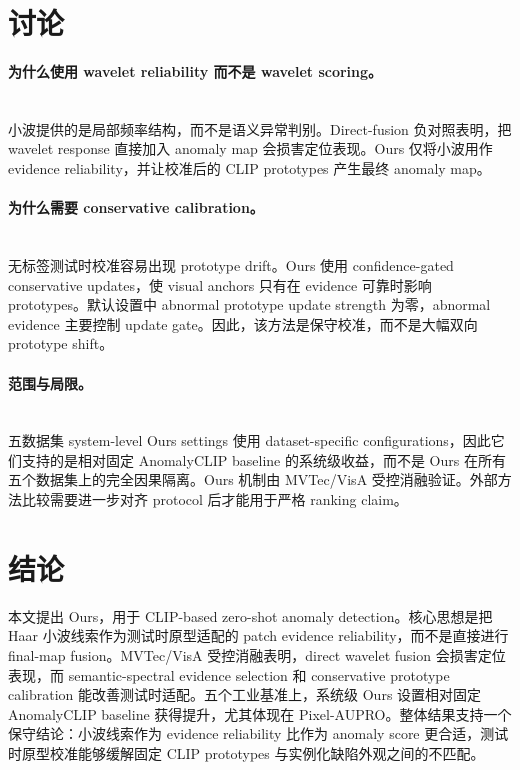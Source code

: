 \documentclass[runningheads]{llncs}
\begin{document}
\section{讨论}

\paragraph{为什么使用 wavelet reliability 而不是 wavelet scoring。}\mbox{}\\
\noindent
小波提供的是局部频率结构，而不是语义异常判别。Direct-fusion 负对照表明，把 wavelet response 直接加入 anomaly map 会损害定位表现。Ours 仅将小波用作 evidence reliability，并让校准后的 CLIP prototypes 产生最终 anomaly map。

\paragraph{为什么需要 conservative calibration。}\mbox{}\\
\noindent
无标签测试时校准容易出现 prototype drift。Ours 使用 confidence-gated conservative updates，使 visual anchors 只有在 evidence 可靠时影响 prototypes。默认设置中 abnormal prototype update strength 为零，abnormal evidence 主要控制 update gate。因此，该方法是保守校准，而不是大幅双向 prototype shift。

\paragraph{范围与局限。}\mbox{}\\
\noindent
五数据集 system-level Ours settings 使用 dataset-specific configurations，因此它们支持的是相对固定 AnomalyCLIP baseline 的系统级收益，而不是 Ours 在所有五个数据集上的完全因果隔离。Ours 机制由 MVTec/VisA 受控消融验证。外部方法比较需要进一步对齐 protocol 后才能用于严格 ranking claim。

\section{结论}

本文提出 Ours，用于 CLIP-based zero-shot anomaly detection。核心思想是把 Haar 小波线索作为测试时原型适配的 patch evidence reliability，而不是直接进行 final-map fusion。MVTec/VisA 受控消融表明，direct wavelet fusion 会损害定位表现，而 semantic-spectral evidence selection 和 conservative prototype calibration 能改善测试时适配。五个工业基准上，系统级 Ours 设置相对固定 AnomalyCLIP baseline 获得提升，尤其体现在 Pixel-AUPRO。整体结果支持一个保守结论：小波线索作为 evidence reliability 比作为 anomaly score 更合适，测试时原型校准能够缓解固定 CLIP prototypes 与实例化缺陷外观之间的不匹配。



\end{document}
